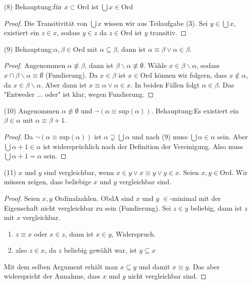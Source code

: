 \documentclass{article}
\newcommand{\claim}{\textsf{Behauptung}:\hspace{0,2cm}}
\theoremstyle{definition}
\theoremstyle{plain}
\theoremstyle{remark}
\newcommand{\unteraufgabe}[1]{
	{
		\vspace*{0.2cm}
\noindent\textsf{(#1)}
}
}
\begin{document}
\unteraufgabe{8} \claim für $x\subset\mathrm{Ord}$ ist $\bigcup x\in \mathrm{Ord}$
\begin{proof}
	Die Transitivität von $\bigcup x$ wissen wir aus Teilaufgabe (3). Sei $y\in \bigcup x$, existiert ein $z\in x$, sodass $y\in z$ da $z\in \mathrm{Ord}$ ist $y$ transitiv.
\end{proof}
\unteraufgabe9 \claim $\alpha, \beta\in \mathrm{Ord}$ mit $\alpha\subseteq\beta$, dann ist $\alpha\equiv\beta \vee \alpha\in\beta$.
\begin{proof}
	Angenommen $\alpha\not\equiv\beta$, dann ist $\beta\backslash\alpha\not\equiv\emptyset$. Wähle $x\in\beta\backslash\alpha$, sodass $x\cap\beta\backslash\alpha\equiv\emptyset$ (Fundierung). Da $x\in \beta$ ist $x\in \mathrm{Ord}$ können wir folgern, dass $x\notin \alpha$, da $x\in\beta\backslash\alpha$. Aber dann ist $x\equiv \alpha\vee \alpha\in x$. In beiden Fällen folgt $\alpha\in\beta$. 
	\remark Das "Entweder ... oder" ist klar, wegen Fundierung.
\end{proof}
\unteraufgabe{10} Angenommen $\alpha\not\equiv \emptyset $ und $\neg (\alpha\equiv \mathrm{sup}(\alpha))$. \claim Es existiert ein $\beta\in\alpha$ mit $\alpha \equiv\beta+1$.
\begin{proof} Da $\neg (\alpha\equiv \mathrm{sup}(\alpha))$ ist $\alpha \supsetneq\bigcup\alpha$ und nach (9) muss $\bigcup\alpha\in\alpha$ sein. Aber $\bigcup \alpha +1 \in \alpha$ ist widersprüchlich nach der Definition der Vereinigung. Also muss $\bigcup \alpha +1 = \alpha$ sein. 
\end{proof}
\unteraufgabe{11} $x$ und $y$ sind vergleichbar, wenn $x\in y \vee x\equiv y \vee y\in x$.
Seien $x,y\in \mathrm{Ord}$. Wir müssen zeigen, dass beliebige $x$ und $y$ vergleichbar sind. 
\begin{proof}
	Seien $x,y$ Ordinalzahlen. ObdA sind $x$ und $y$ $\in$-minimal mit der Eigenschaft nicht vergleichbar zu sein (Fundierung).
	Sei $z\in y$ beliebig, dann ist $z$ mit $x$ vergleichbar.
	\begin{enumerate}
	\item $z \equiv x$ oder $x\in z$, dann ist $x\in y$, Widerspruch.
	\item also $z\in x$, da $z$ beliebig gewählt war, ist $y\subseteq x$
	\end{enumerate}
Mit dem selben Argument erhält man $x\subseteq y$ und damit $x \equiv y$. Das aber widerspricht der Annahme, dass $x$ und $y$ nicht vergleichbar sind.
\end{proof}
\end{document}
